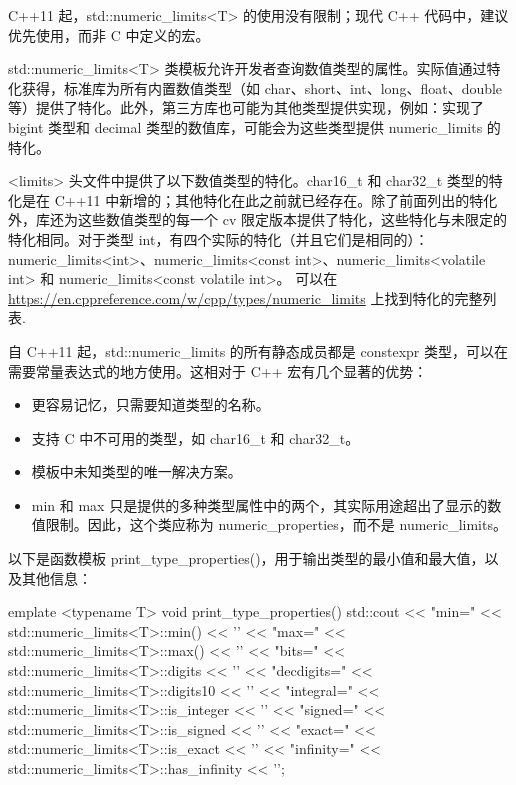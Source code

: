 \begin{myNotic}
C++11 起，std::numeric\_limits<T> 的使用没有限制；现代 C++ 代码中，建议优先使用，而非 C 中定义的宏。
\end{myNotic}


std::numeric\_limits<T> 类模板允许开发者查询数值类型的属性。实际值通过特化获得，标准库为所有内置数值类型（如 char、short、int、long、float、double 等）提供了特化。此外，第三方库也可能为其他类型提供实现，例如：实现了 bigint 类型和 decimal 类型的数值库，可能会为这些类型提供 numeric\_limits 的特化。

<limits> 头文件中提供了以下数值类型的特化。char16\_t 和 char32\_t 类型的特化是在 C++11 中新增的；其他特化在此之前就已经存在。除了前面列出的特化外，库还为这些数值类型的每一个 cv 限定版本提供了特化，这些特化与未限定的特化相同。对于类型 int，有四个实际的特化（并且它们是相同的）：numeric\_limits<int>、numeric\_limits<const int>、numeric\_limits<volatile int> 和 numeric\_limits<const volatile int>。 可以在 \url{https://en.cppreference.com/w/cpp/types/numeric_limits} 上找到特化的完整列表.

自 C++11 起，std::numeric\_limits 的所有静态成员都是 constexpr 类型，可以在需要常量表达式的地方使用。这相对于 C++ 宏有几个显著的优势：

\begin{itemize}
\item
更容易记忆，只需要知道类型的名称。

\item
支持 C 中不可用的类型，如 char16\_t 和 char32\_t。

\item
模板中未知类型的唯一解决方案。

\item
min 和 max 只是提供的多种类型属性中的两个，其实际用途超出了显示的数值限制。因此，这个类应称为 numeric\_properties，而不是 numeric\_limits。
\end{itemize}

以下是函数模板 print\_type\_properties()，用于输出类型的最小值和最大值，以及其他信息：

\begin{cpp}
emplate <typename T>
void print_type_properties()
{
    std::cout
    << "min="
    << std::numeric_limits<T>::min()        << '\n'
    << "max="
    << std::numeric_limits<T>::max()        << '\n'
    << "bits="
    << std::numeric_limits<T>::digits       << '\n'
    << "decdigits="
    << std::numeric_limits<T>::digits10     << '\n'
    << "integral="
    << std::numeric_limits<T>::is_integer   << '\n'
    << "signed="
    << std::numeric_limits<T>::is_signed    << '\n'
    << "exact="
    << std::numeric_limits<T>::is_exact     << '\n'
    << "infinity="
    << std::numeric_limits<T>::has_infinity << '\n';
}
\end{cpp}

